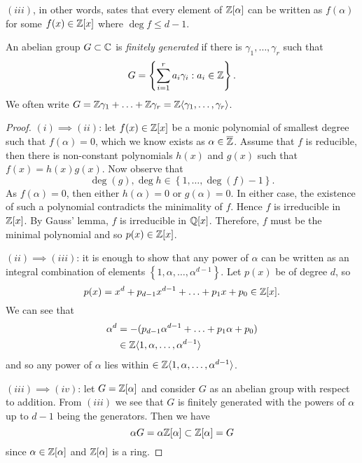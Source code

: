 
$(iii)$, in other words, sates that every element of
$\mathbb{Z}[\alpha]$ can be written as $f(\alpha)$ for some
$f(x) \in \mathbb{Z}[x]$ where $\deg f \leq d - 1$.

An abelian group $G \subset \mathbb{C}$ is \emph{finitely generated}
if there is $\gamma_1, \ldots, \gamma_r$ such that
\[
	G = \left\{ \sum_{i=1}^r a_i \gamma_i : a_i \in \mathbb{Z} \right\}.
\]
We often write
$G = \mathbb{Z}\gamma_1 + \ldots + \mathbb{Z}\gamma_r
= \mathbb{Z} \langle \gamma_1, \ldots, \gamma_r \rangle$.

\begin{proof}
	$(i) \implies (ii)$: let $f(x) \in \mathbb{Z}[x]$ be a monic polynomial
	of smallest degree such that $f(\alpha) = 0$,
	which we know exists as $\alpha \in \overline{\mathbb{Z}}$.
	Assume that $f$ is reducible, then there is non-constant polynomials
	$h(x)$ and $g(x)$ such that $f(x) = h(x) g(x)$.
	Now observe that
	\[
		\deg(g), \deg h \in \left\{ 1, \ldots, \deg(f) - 1 \right\}.
	\]
	As $f(\alpha) = 0$, then either $h(\alpha) = 0$ or $g(\alpha) = 0$.
	In either case, the existence of such a polynomial contradicts
	the minimality of $f$. 
	Hence $f$ is irreducible in $\mathbb{Z}[x]$.
	By Gauss' lemma, $f$ is irreducible in $\mathbb{Q}[x]$.
	Therefore, $f$ must be the minimal polynomial
	and so $p(x) \in \mathbb{Z}[x]$.
	
	$(ii) \implies (iii)$: it is enough to show that any power of $\alpha$
	can be written as an integral combination of elements
	$ \left\{ 1, \alpha, \ldots, \alpha^{d-1} \right\} $.
	Let $p(x)$ be of degree $d$, so
	\[
		p(x) = x^d + p_{d-1}x^{d-1} + \ldots + p_1 x + p_0 \in \mathbb{Z}[x].
	\]
	We can see that
	\begin{align*}
		\alpha^d
		&= -(p_{d-1}\alpha^{d-1} + \ldots + p_1 \alpha + p_0) \\
		&\in \mathbb{Z} \langle 1, \alpha, \ldots, \alpha^{d-1} \rangle
	\end{align*}
	and so any power of $\alpha$ lies within
	$\in \mathbb{Z} \langle 1, \alpha, \ldots, \alpha^{d-1} \rangle$.

	$(iii) \implies (iv)$: let $G = \mathbb{Z}[\alpha]$ and consider $G$ as an
	abelian group with respect to addition.
	From $(iii)$ we see that $G$ is finitely generated with the powers of
	$\alpha$ up to $d-1$ being the generators.
	Then we have
	\[
		\alpha G = \alpha \mathbb{Z}[\alpha] \subset \mathbb{Z}[\alpha] = G
	\]
	since $\alpha \in \mathbb{Z}[\alpha]$ and $\mathbb{Z}[\alpha]$ is a ring.


\end{proof}
